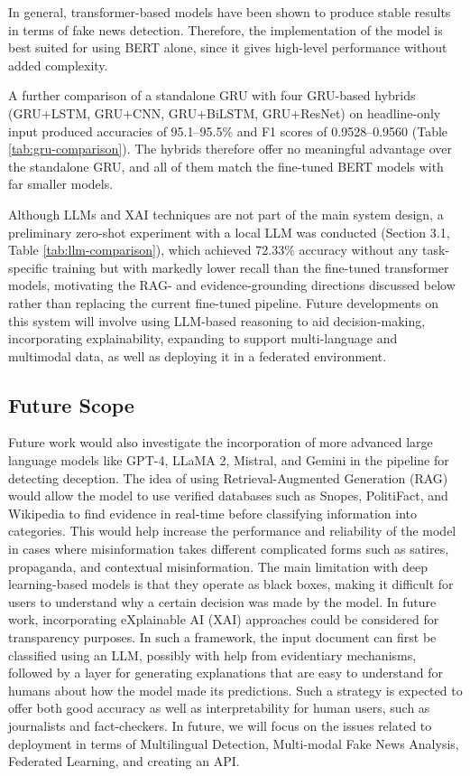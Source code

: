 \documentclass[runningheads]{llncs}
\begin{document}
In general, transformer-based models have been shown to produce stable results in terms of fake news detection. Therefore, the implementation of the model is best suited for using BERT alone, since it gives high-level performance without added complexity.

A further comparison of a standalone GRU with four GRU-based hybrids (GRU+LSTM, GRU+CNN, GRU+BiLSTM, GRU+ResNet) on headline-only input produced accuracies of 95.1--95.5\% and F1 scores of 0.9528--0.9560 (Table \ref{tab:gru-comparison}). The hybrids therefore offer no meaningful advantage over the standalone GRU, and all of them match the fine-tuned BERT models with far smaller models.

Although LLMs and XAI techniques are not part of the main system design, a preliminary zero-shot experiment with a local LLM was conducted (Section 3.1, Table \ref{tab:llm-comparison}), which achieved 72.33\% accuracy without any task-specific training but with markedly lower recall than the fine-tuned transformer models, motivating the RAG- and evidence-grounding directions discussed below rather than replacing the current fine-tuned pipeline. Future developments on this system will involve using LLM-based reasoning to aid decision-making, incorporating explainability, expanding to support multi-language and multimodal data, as well as deploying it in a federated environment.

\subsection{Future Scope}

Future work would also investigate the incorporation of more advanced large language models like GPT-4, LLaMA 2, Mistral, and Gemini in the pipeline for detecting deception. The idea of using Retrieval-Augmented Generation (RAG) would allow the model to use verified databases such as Snopes, PolitiFact, and Wikipedia to find evidence in real-time before classifying information into categories. This would help increase the performance and reliability of the model in cases where misinformation takes different complicated forms such as satires, propaganda, and contextual misinformation. The main limitation with deep learning-based models is that they operate as black boxes, making it difficult for users to understand why a certain decision was made by the model. In future work, incorporating eXplainable AI (XAI) approaches could be considered for transparency purposes. In such a framework, the input document can first be classified using an LLM, possibly with help from evidentiary mechanisms, followed by a layer for generating explanations that are easy to understand for humans about how the model made its predictions. Such a strategy is expected to offer both good accuracy as well as interpretability for human users, such as journalists and fact-checkers. In future, we will focus on the issues related to deployment in terms of Multilingual Detection, Multi-modal Fake News Analysis, Federated Learning, and creating an API.


\end{document}
